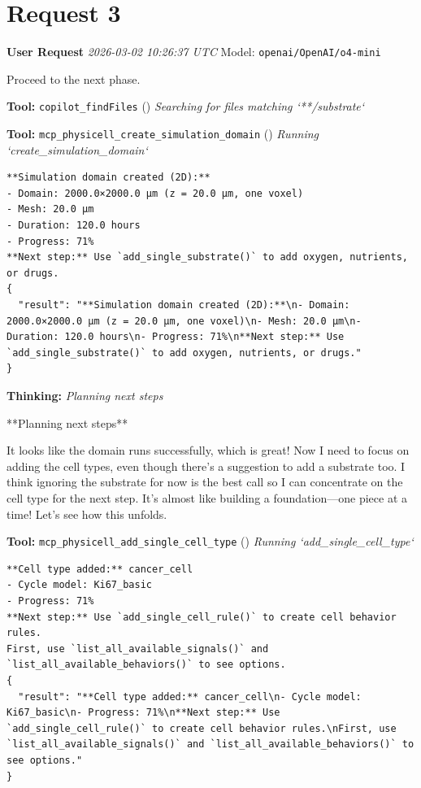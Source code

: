 \documentclass[11pt,a4paper]{article}
\begin{document}
\section{Request 3}
\begin{userbox}
\textbf{User Request}
\quad \textit{2026-03-02 10:26:37 UTC}
\quad Model: \texttt{openai/OpenAI/o4-mini}

Proceed to the next phase.

\end{userbox}
\begin{toolokbox}
\textbf{Tool:} \texttt{copilot\_findFiles} (\checkmark)
\textit{Searching for files matching `**/substrate`}
\end{toolokbox}
\begin{toolokbox}
\textbf{Tool:} \texttt{mcp\_physicell\_create\_simulation\_domain} (\checkmark)
\textit{Running `create\_simulation\_domain`}
\begin{lstlisting}
**Simulation domain created (2D):**
- Domain: 2000.0×2000.0 μm (z = 20.0 μm, one voxel)
- Mesh: 20.0 μm
- Duration: 120.0 hours
- Progress: 71%
**Next step:** Use `add_single_substrate()` to add oxygen, nutrients, or drugs.
{
  "result": "**Simulation domain created (2D):**\n- Domain: 2000.0×2000.0 μm (z = 20.0 μm, one voxel)\n- Mesh: 20.0 μm\n- Duration: 120.0 hours\n- Progress: 71%\n**Next step:** Use `add_single_substrate()` to add oxygen, nutrients, or drugs."
}
\end{lstlisting}
\end{toolokbox}
\begin{thinkbox}
\textbf{Thinking:} \textit{Planning next steps}

**Planning next steps**

It looks like the domain runs successfully, which is great! Now I need to focus on adding the cell types, even though there's a suggestion to add a substrate too. I think ignoring the substrate for now is the best call so I can concentrate on the cell type for the next step. It's almost like building a foundation—one piece at a time! Let’s see how this unfolds.

\end{thinkbox}
\begin{toolokbox}
\textbf{Tool:} \texttt{mcp\_physicell\_add\_single\_cell\_type} (\checkmark)
\textit{Running `add\_single\_cell\_type`}
\begin{lstlisting}
**Cell type added:** cancer_cell
- Cycle model: Ki67_basic
- Progress: 71%
**Next step:** Use `add_single_cell_rule()` to create cell behavior rules.
First, use `list_all_available_signals()` and `list_all_available_behaviors()` to see options.
{
  "result": "**Cell type added:** cancer_cell\n- Cycle model: Ki67_basic\n- Progress: 71%\n**Next step:** Use `add_single_cell_rule()` to create cell behavior rules.\nFirst, use `list_all_available_signals()` and `list_all_available_behaviors()` to see options."
}
\end{lstlisting}
\end{toolokbox}
\end{document}
